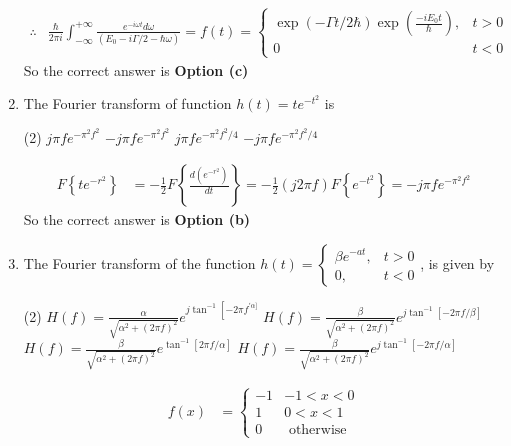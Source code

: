\begin{enumerate}
\begin{answer}
\begin{align*}
	\therefore &\frac{\hbar}{2 \pi i} \int_{-\infty}^{+\infty} \frac{e^{-i \omega t} d \omega}{\left(E_{0}-i \Gamma / 2-\hbar \omega\right)}=f(t)= \begin{cases}\exp (-\Gamma t / 2 \hbar) \exp \left(\frac{-i E_{0} t}{\hbar}\right), & t>0 \\ 0 & t<0\end{cases}
	\end{align*}
	So the correct answer is \textbf{Option (c)}
\end{answer}
\item The Fourier transform of function $h(t)=t e^{-t^{2}}$ is 
\begin{tasks}(2)
	\task[\textbf{a.}] $j \pi f e^{-\pi^{2} f^{2}}$
	\task[\textbf{b.}]$-j \pi f e^{-\pi^{2} f^{2}}$
	\task[\textbf{c.}]$j \pi f e^{-\pi^{2} f^{2} / 4}$
	\task[\textbf{d.}] $-j \pi f e^{-\pi^{2} f^{2} / 4}$
\end{tasks}
\begin{answer}
	\begin{align*}
	F\left\{t e^{-r^{2}}\right\}&=-\frac{1}{2} F\left\{\frac{d\left(e^{-r^{2}}\right)}{d t}\right\}=-\frac{1}{2}(j 2 \pi f) F\left\{e^{-t^{2}}\right\}=-j \pi f e^{-\pi^{2} f^{2}}
	\end{align*}
	So the correct answer is \textbf{Option (b)}
\end{answer}
\item The Fourier transform of the function $h(t)=\left\{\begin{array}{cc}\beta e^{-a t}, & t>0 \\ 0, & t<0\end{array}\right.$, is given by
\begin{tasks}(2)
	\task[\textbf{a.}]$H(f)=\frac{\alpha}{\sqrt{\alpha^{2}+(2 \pi f)^{2}}} e^{j \tan ^{-1}\left[-2 \pi f^{\prime \alpha]}\right.}$
	\task[\textbf{b.}]$H(f)=\frac{\beta}{\sqrt{\alpha^{2}+(2 \pi f)^{2}}} e^{j \tan ^{-1}[-2 \pi f / \beta]}$
	\task[\textbf{c.}]$H(f)=\frac{\beta}{\sqrt{\alpha^{2}+(2 \pi f)^{2}}} e^{\tan ^{-1}[2 \pi f / \alpha]}$
	\task[\textbf{d.}] $H(f)=\frac{\beta}{\sqrt{\alpha^{2}+(2 \pi f)^{2}}} e^{j \tan ^{-1}[-2 \pi f / \alpha]}$
\end{tasks}
\begin{answer}
	\begin{align*}
	f(x)&=\left\{\begin{array}{rl}-1 & -1<x<0 \\ 1 & 0<x<1 \\ 0 & \text { otherwise }\end{array}\right.\\

\end{align*}
\end{answer}
\end{enumerate}

